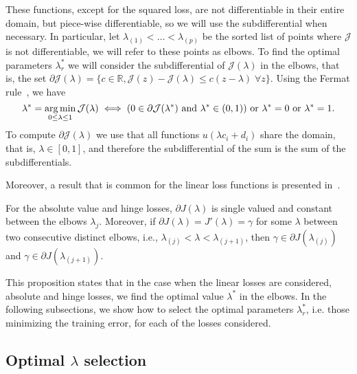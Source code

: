 %
These functions, except for the squared loss, are not differentiable in their entire domain, but piece-wise differentiable, so we will use the subdifferential when necessary.  In particular, let ${\lambda}_{(1)} < \ldots < {\lambda}_{(p)}$ be the sorted list of points where $\mathcal{J}$ is not differentiable, we will refer to these points as elbows.
To find the optimal parameters $\lambda_r^*$ we will consider the subdifferential of $\mathcal{J}(\lambda)$ in the elbows, that is, the set $\partial \mathcal{J}(\lambda) = \{c \in \mathbb{R}, \mathcal{J}(z)-\mathcal{J}(\lambda) \leq c (z - \lambda)\;  \forall z \}$.
%
Using the Fermat rule~\citep{BauschkeC11}, we have
\begin{equation}
    \nonumber
    \lambda^* = \operatorname*{arg\min}_{0 \leq \lambda \leq 1} \mathcal{J}(\lambda) \iff (0 \in \partial \mathcal{J}(\lambda^*) \text{ and } \lambda^* \in (0, 1) ) \text{ or } \lambda^*=0 \text{ or } \lambda^*=1 .
\end{equation}
To compute $\partial \mathcal{J}(\lambda)$ we use that all functions $u(\lambda c_i + d_i)$ share the domain, that is, $\lambda \in [0, 1]$, and therefore the subdifferential of the sum is the sum of the subdifferentials.
%

Moreover, a result that is common for the linear loss functions is presented in~\citet[Proposition 1]{RuizAD21}.
\begin{prop}\label{prop:elbows_neurocom2020}
    For the absolute value and hinge losses, $\partial J(\lambda)$ is single valued and constant between the elbows $\lambda_j$.
    Moreover, if $\partial J(\lambda) = J'(\lambda) = \gamma$ for some $\lambda$ between two consecutive distinct elbows, i.e., $\lambda_{(j)} < \lambda < \lambda_{(j+1)}$, then $\gamma \in \partial J(\lambda_{(j)})$ and $\gamma \in \partial J(\lambda_{(j+1)})$. 
\end{prop}
This proposition states that in the case when the linear losses are considered, absolute and hinge losses, we find the optimal value $\lambda^*$ in the elbows.
In the following subsections, we show how to select the optimal parameters $\lambda_r^*$, i.e. those minimizing the training error, for each of the losses considered.

\subsection{Optimal $\lambda$ selection}
